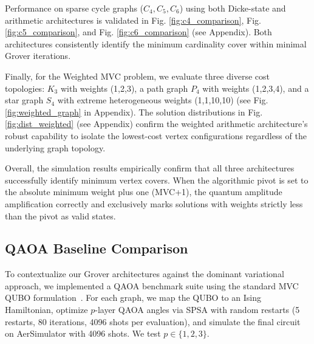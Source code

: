 \documentclass{ieeeaccess}
\begin{document}
Performance on sparse cycle graphs ($C_4, C_5, C_6$) using both Dicke-state and arithmetic architectures is validated in Fig. \ref{fig:c4_comparison}, Fig. \ref{fig:c5_comparison}, and Fig. \ref{fig:c6_comparison} (see Appendix). Both architectures consistently identify the minimum cardinality cover within minimal Grover iterations.

Finally, for the Weighted MVC problem, we evaluate three diverse cost topologies: $K_3$ with weights (1,2,3), a path graph $P_4$ with weights (1,2,3,4), and a star graph $S_4$ with extreme heterogeneous weights (1,1,10,10) (see Fig. \ref{fig:weighted_graph} in Appendix). The solution distributions in Fig. \ref{fig:dist_weighted} (see Appendix) confirm the weighted arithmetic architecture's robust capability to isolate the lowest-cost vertex configurations regardless of the underlying graph topology.

Overall, the simulation results empirically confirm that all three architectures successfully identify minimum vertex covers. When the algorithmic pivot is set to the absolute minimum weight plus one (MVC+1), the quantum amplitude amplification correctly and exclusively marks solutions with weights strictly less than the pivot as valid states.


\subsection{QAOA Baseline Comparison}
\label{sec:qaoa_comparison}

To contextualize our Grover architectures against the
dominant variational approach, we implemented a QAOA
benchmark suite using the standard MVC QUBO
formulation~\cite{farhi2014qaoa,pellow-jarman_qaoa_2024}.
For each graph, we map the QUBO to an Ising Hamiltonian,
optimize $p$-layer QAOA angles via SPSA with random
restarts (5 restarts, 80 iterations, 4096 shots per
evaluation), and simulate the final circuit on
AerSimulator with 4096 shots. We test $p \in \{1,2,3\}$.

\end{document}
